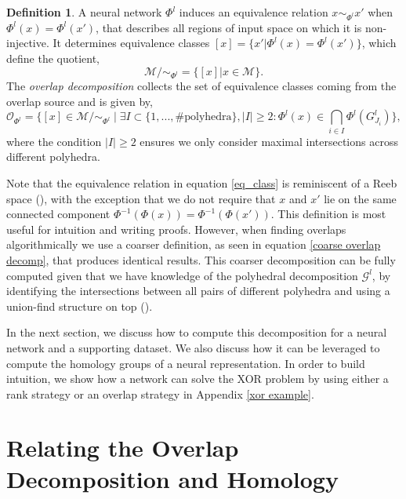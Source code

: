 \documentclass[10pt]{article} %
\theoremstyle{plain}
\theoremstyle{definition}
\newtheorem{definition}[theorem]{Definition}
\theoremstyle{remark}
\begin{document}
\begin{definition}
    \label{Overlap definition}
    A neural network $\Phi^l$ induces an equivalence relation {$x \sim_{\Phi^l} x' $ when $\Phi^l(x)=\Phi^l(x')$}, that describes all regions of input space on which it is non-injective. It determines equivalence classes $[x] = \{x'|\Phi^l(x)=\Phi^l(x')\}$, which define the quotient,
    \begin{equation}
        \label{eq_class}
        \mathcal{M}/ \sim_{\Phi^l} = \{[x]| x\in \mathcal{M}\}.
    \end{equation}
     The \textit{overlap decomposition} {collects} the set of equivalence classes coming from the overlap source and is given by,
    \begin{equation}
    \label{overlap decomp equation}
         \mathcal{O}_{\Phi^l} = \Big\{[x] \in \mathcal{M}/\sim_{\Phi^l} \mid \exists I \subset \{1,...,\#\text{polyhedra}\},|I|\geq 2: \Phi^l(x) \in \bigcap\limits_{i \in I} \Phi^l(G^l_{J_i}) \Big \},
    \end{equation}
    {where the condition $|I|\geq2$ ensures we only consider maximal intersections across different polyhedra.}
\end{definition}

Note that the equivalence relation in equation \ref{eq_class} is reminiscent of a Reeb space (\cite{edelsbrunner2008reeb}), with the exception that we do not require that $x$ and $x'$ lie on the same connected component $\Phi^{-1}(\Phi(x)) = \Phi^{-1}(\Phi(x'))$. This definition is most useful for intuition and writing proofs. However, when finding overlaps algorithmically we use a coarser definition, as seen in equation \ref{coarse overlap decomp}, that produces identical results. This coarser decomposition can be fully computed given that we have knowledge of the polyhedral decomposition $\mathcal{G}^l$, by identifying the intersections between all pairs of different polyhedra and using a union-find structure on top (\cite{kleinberg2006algorithm}). 

In the next section, we discuss how to compute this decomposition for a neural network and a supporting dataset. We also discuss how it can be leveraged to compute the homology groups of a neural representation. In order to build intuition, we show how a network can solve the XOR problem by using either a rank strategy or an overlap strategy in Appendix \ref{xor example}.


\section{Relating the Overlap Decomposition and Homology} %
\label{Relative Homology}
\end{document}
